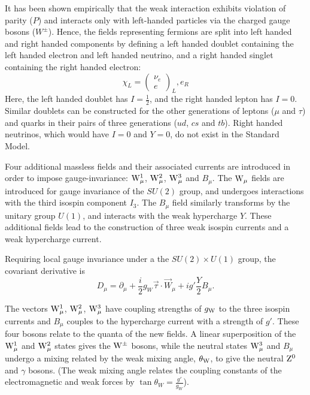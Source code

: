 It has been shown empirically that the weak interaction exhibits violation of parity ($P$) and interacts
only with left-handed particles via the charged gauge bosons ($W^{\pm}$). Hence, the fields representing
fermions are split into left handed and right handed components by defining a left handed doublet
containing the left handed electron and left handed neutrino, and a right handed singlet containing the right
handed electron:
\begin{equation}
\chi_{L} = \left( \begin{array}{c} \nu_{e} \\ e \end{array}\right)_{L}, e_{R}
\end{equation}
Here, the left handed doublet has $I=\frac{1}{2}$, and the right handed lepton has $I = 0$. Similar doublets
can be constructed for the other generations of leptons ($\mu$ and $\tau$) and quarks in their pairs of three
generations ($ud$, $cs$ and $tb$). Right handed neutrinos, which would have $I=0$ and $Y=0$, do not exist in
the Standard Model. %

Four additional massless fields and their associated currents are introduced in order to impose
gauge-invariance: $\mathrm{W}_{\mu}^{1}$, $\mathrm{W}_{\mu}^{2}$, $\mathrm{W}_{\mu}^{3}$ and $B_{\mu}$. The $\mathrm{W}_{\mu}$ fields are
introduced for gauge invariance of the $SU(2)$ group, and undergoes interactions with the third isospin
component $I_{3}$. The $B_{\mu}$ field similarly transforms by the unitary group $U(1)$, and interacts with
the weak hypercharge $Y$. These additional fields lead to the construction of three weak isospin currents and
a weak hypercharge current.

Requiring local gauge invariance under a the $SU(2) \times U(1)$ group, the covariant derivative is
\begin{equation}
D_{\mu} = \partial_{\mu} + \frac{i}{2} g_{W} \vec{\tau} \cdot \vec{W}_{\mu} + ig' \frac{Y}{2}B_{\mu}.
\end{equation}

The vectors $\mathrm{W}_{\mu}^{1}$, $\mathrm{W}_{\mu}^{2}$, $\mathrm{W}_{\mu}^{3}$ have coupling strengths of $g_{\mathrm{W}}$ to the three
isospin currents and $B_{\mu}$ couples to the hypercharge current with a strength of $g'$. These four bosons
relate to the quanta of the new fields. A linear superposition of the $\mathrm{W}_{\mu}^{1}$ and $\mathrm{W}_{\mu}^{2}$ states
gives the $\mathrm{W}^{\pm}$ bosons, while the neutral states $\mathrm{W}_{\mu}^{3}$ and $B_{\mu}$ undergo a mixing related by
the weak mixing angle, $\theta_{\mathrm{W}}$, to give the neutral $\mathrm{Z}^{0}$ and $\gamma$ bosons. (The weak mixing angle
relates the coupling constants of the electromagnetic and weak forces by $\tan \theta_{W} =
\frac{g'}{g_{W}}$).

